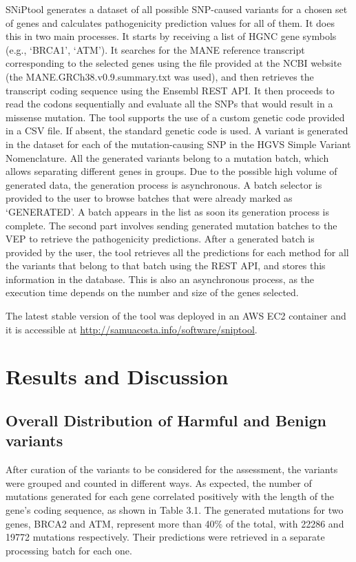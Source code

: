 \documentclass[12pt,MSc,wordcount,anon]{muthesis}
\begin{document}
\begin{flushleft}
SNiPtool generates a dataset of all possible SNP-caused variants for a chosen set of genes and calculates pathogenicity prediction values for all of them. It does this in two main processes. It starts by receiving a list of HGNC gene symbols (e.g., `BRCA1', `ATM'). It searches for the MANE reference transcript corresponding to the selected genes using the file provided at the NCBI website (the MANE.GRCh38.v0.9.summary.txt was used), and then retrieves the transcript coding sequence using the Ensembl REST API. It then proceeds to read the codons sequentially and evaluate all the SNPs that would result in a missense mutation. The tool supports the use of a custom genetic code provided in a CSV file. If absent, the standard genetic code is used. A variant is generated in the dataset for each of the mutation-causing SNP in the HGVS Simple Variant Nomenclature. All the generated variants belong to a mutation batch, which allows separating different genes in groups. Due to the possible high volume of generated data, the generation process is asynchronous. A batch selector is provided to the user to browse batches that were already marked as `GENERATED'. A batch appears in the list as soon its generation process is complete.
The second part involves sending generated mutation batches to the VEP to retrieve the pathogenicity predictions. After a generated batch is provided by the user, the tool retrieves all the predictions for each method for all the variants that belong to that batch using the REST API, and stores this information in the database. This is also an asynchronous process, as the execution time depends on the number and size of the genes selected.

The latest stable version of the tool was deployed in an AWS EC2 container and it is accessible at \url{http://samuacosta.info/software/sniptool}.

\chapter{Results and Discussion}
\label{cha:results}

\section{Overall Distribution of Harmful and Benign variants}

After curation of the variants to be considered for the assessment, the variants were grouped and counted in different ways. As expected, the number of mutations generated for each gene correlated positively with the length of the gene's coding sequence, as shown in Table 3.1. The generated mutations for two genes, BRCA2 and ATM, represent more than 40\% of the total, with 22286 and 19772 mutations respectively. Their predictions were retrieved in a separate processing batch for each one.


\end{flushleft}
\end{document}
